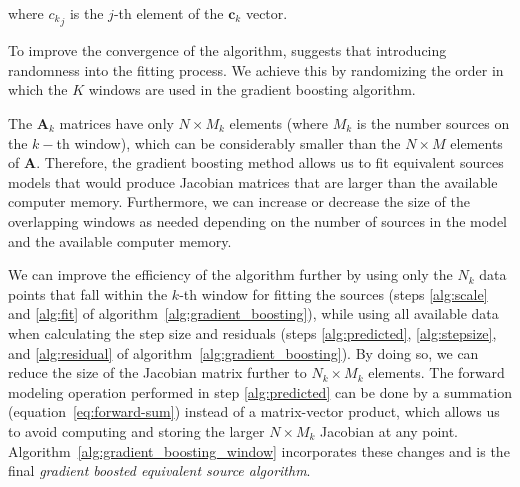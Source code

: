 \documentclass[twocolumn]{article}
\begin{document}
\noindent where ${c_k}_j$ is the $j$-th element of the $\mathbf{c}_k$ vector.

To improve the convergence of the algorithm, \citet{friedman2002} suggests that
introducing randomness into the fitting process. We achieve this by randomizing
the order in which the $K$ windows are used in the gradient boosting algorithm.

The $\mathbf{A}_k$ matrices have only $N \times M_k$ elements
(where $M_k$ is the number sources on the $k-$th window), which can be
considerably smaller than the $N \times M$ elements of $\mathbf{A}$.
Therefore, the gradient boosting method allows us to fit
equivalent sources models that would produce Jacobian matrices that are larger
than the available computer memory.
Furthermore, we can increase or decrease the size of the overlapping windows as
needed depending on the number of sources in the model and the available
computer memory.

We can improve the efficiency of the algorithm further by using only the $N_k$ data
points that fall within the $k$-th window for fitting the sources
(steps \ref{alg:scale} and \ref{alg:fit} of
algorithm~\ref{alg:gradient_boosting}),
while using all available data when calculating the step size and residuals
(steps \ref{alg:predicted}, \ref{alg:stepsize}, and \ref{alg:residual}
of algorithm~\ref{alg:gradient_boosting}).
By doing so, we can reduce the size of the Jacobian matrix further to $N_k
\times M_k$ elements.
The forward modeling operation performed in step \ref{alg:predicted} can be
done by a summation (equation~\ref{eq:forward-sum})
instead of a matrix-vector product, which allows us to avoid computing and
storing the larger $N \times M_k$ Jacobian at any point.
Algorithm~\ref{alg:gradient_boosting_window} incorporates these changes and is
the final \textit{gradient boosted equivalent source algorithm}.
\end{document}
